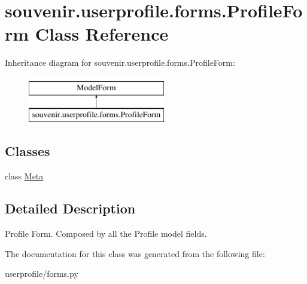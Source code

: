 \hypertarget{classsouvenir_1_1userprofile_1_1forms_1_1ProfileForm}{\section{souvenir.\-userprofile.\-forms.\-Profile\-Form Class Reference}
\label{classsouvenir_1_1userprofile_1_1forms_1_1ProfileForm}
}
Inheritance diagram for souvenir.\-userprofile.\-forms.\-Profile\-Form\-:\begin{figure}[H]
\begin{center}
\leavevmode
\includegraphics[height=2.000000cm]{classsouvenir_1_1userprofile_1_1forms_1_1ProfileForm}
\end{center}
\end{figure}
\subsection*{Classes}
\begin{DoxyCompactItemize}
\item 
class \hyperlink{classsouvenir_1_1userprofile_1_1forms_1_1ProfileForm_1_1Meta}{Meta}
\end{DoxyCompactItemize}


\subsection{Detailed Description}
\begin{DoxyVerb}Profile Form. Composed by all the Profile model fields.
\end{DoxyVerb}
 

The documentation for this class was generated from the following file\-:\begin{DoxyCompactItemize}
\item 
userprofile/forms.\-py\end{DoxyCompactItemize}
